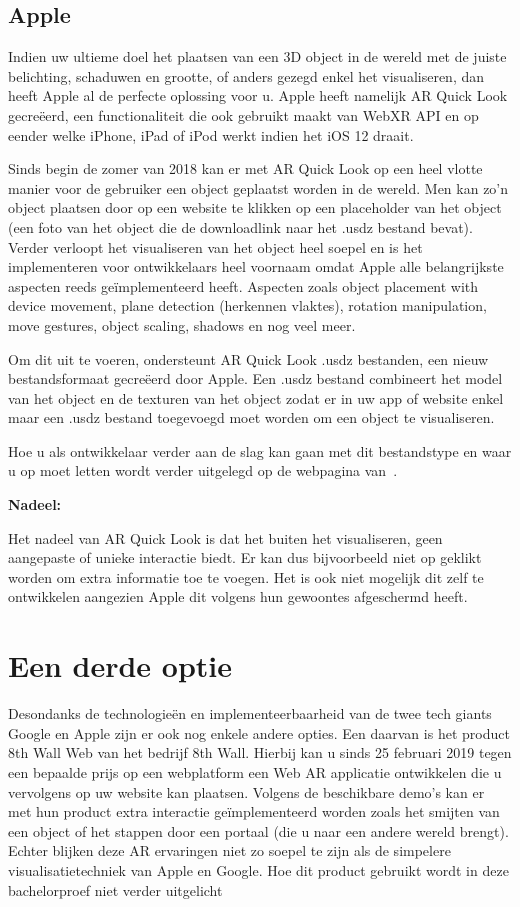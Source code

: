 \subsection{Apple}

Indien uw ultieme doel het plaatsen van een 3D object in de wereld met de juiste belichting, schaduwen en grootte, of anders gezegd enkel het visualiseren, dan heeft Apple al de perfecte oplossing voor u. Apple heeft namelijk AR Quick Look gecreëerd, een functionaliteit die ook gebruikt maakt van WebXR API en op eender welke iPhone, iPad of iPod werkt indien het iOS 12 draait. 

Sinds begin de zomer van 2018 kan er met AR Quick Look op een heel vlotte manier voor de gebruiker een object geplaatst worden in de wereld. Men kan zo'n object plaatsen door op een website te klikken op een placeholder van het object (een foto van het object die de downloadlink naar het .usdz bestand bevat). Verder verloopt het visualiseren van het object heel soepel en is het implementeren voor ontwikkelaars heel voornaam omdat Apple alle belangrijkste aspecten reeds geïmplementeerd heeft. Aspecten zoals object placement with device movement, plane detection (herkennen vlaktes), rotation manipulation, move gestures, object scaling, shadows en nog veel meer. 

Om dit uit te voeren, ondersteunt AR Quick Look .usdz bestanden, een nieuw bestandsformaat gecreëerd door Apple. Een .usdz bestand combineert het model van het object en de texturen van het object zodat er in uw app of website enkel maar een .usdz bestand toegevoegd moet worden om een object te visualiseren. 

Hoe u als ontwikkelaar verder aan de slag kan gaan met dit bestandstype en waar u op moet letten wordt verder uitgelegd op de webpagina van~\textcite{Apple2018}.

\textbf{Nadeel:}

Het nadeel van AR Quick Look is dat het buiten het visualiseren, geen aangepaste of unieke interactie biedt. Er kan dus bijvoorbeeld niet op geklikt worden om extra informatie toe te voegen. Het is ook niet mogelijk dit zelf te ontwikkelen aangezien Apple dit volgens hun gewoontes afgeschermd heeft. 

\section{Een derde optie}
\label{sec:een-derde-optie}

Desondanks de technologieën en implementeerbaarheid van de twee tech giants Google en Apple zijn er ook nog enkele andere opties. Een daarvan is het product 8th Wall Web van het bedrijf 8th Wall. Hierbij kan u sinds 25 februari 2019 tegen een bepaalde prijs op een webplatform een Web AR applicatie ontwikkelen die u vervolgens op uw website kan plaatsen. Volgens de beschikbare demo's kan er met hun product extra interactie geïmplementeerd worden zoals het smijten van een object of het stappen door een portaal (die u naar een andere wereld brengt). Echter blijken deze AR ervaringen niet zo soepel te zijn als de simpelere visualisatietechniek van Apple en Google. Hoe dit product gebruikt wordt in deze bachelorproef niet verder uitgelicht 

